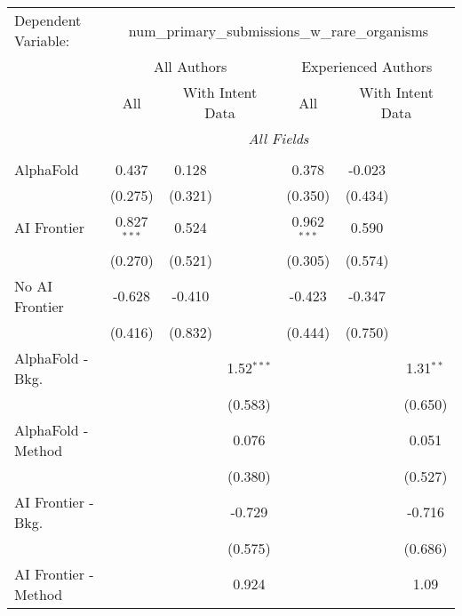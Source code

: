 \begingroup
\centering
\begin{tabular}{lcccccc}
   \tabularnewline \midrule \midrule
   Dependent Variable: & \multicolumn{6}{c}{num\_primary\_submissions\_w\_rare\_organisms}\\
 & \multicolumn{3}{c}{All Authors} & \multicolumn{3}{c}{Experienced Authors} \\
\cmidrule(lr){2-4} \cmidrule(lr){5-7}
 & \multicolumn{1}{c}{All} & \multicolumn{2}{c}{With Intent Data} & \multicolumn{1}{c}{All} & \multicolumn{2}{c}{With Intent Data} \\
\cmidrule(lr){2-2} \cmidrule(lr){3-4} \cmidrule(lr){5-5} \cmidrule(lr){6-7}
 & \multicolumn{6}{c}{\textit{All Fields}} \\ \\
   AlphaFold               & 0.437         & 0.128   &               & 0.378         & -0.023  &   \\   
                           & (0.275)       & (0.321) &               & (0.350)       & (0.434) &   \\   
   AI Frontier             & 0.827$^{***}$ & 0.524   &               & 0.962$^{***}$ & 0.590   &   \\   
                           & (0.270)       & (0.521) &               & (0.305)       & (0.574) &   \\   
   No AI Frontier          & -0.628        & -0.410  &               & -0.423        & -0.347  &   \\   
                           & (0.416)       & (0.832) &               & (0.444)       & (0.750) &   \\   
   AlphaFold - Bkg.        &               &         & 1.52$^{***}$  &               &         & 1.31$^{**}$\\   
                           &               &         & (0.583)       &               &         & (0.650)\\   
   AlphaFold - Method      &               &         & 0.076         &               &         & 0.051\\   
                           &               &         & (0.380)       &               &         & (0.527)\\   
   AI Frontier - Bkg.      &               &         & -0.729        &               &         & -0.716\\   
                           &               &         & (0.575)       &               &         & (0.686)\\   
   AI Frontier - Method    &               &         & 0.924         &               &         & 1.09\\   

\end{tabular}

